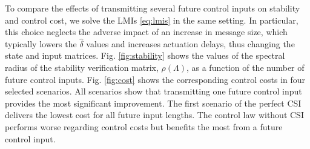 \documentclass[journal,twoside,web]{ieeecolor}
\begin{document}
To compare the effects of transmitting several future control inputs on stability and control cost, we solve the LMIs \eqref{eq:lmis} in the same setting. In particular, this choice neglects the adverse impact of an increase in message size, which typically lowers the $\hat{\delta}$ values and increases actuation delays, thus changing the state and input matrices. Fig. \ref{fig:stability} shows the values of the spectral radius of the stability verification matrix, $\rho(\mathit{\Lambda})$, as a function of the number of future control inputs. Fig. \ref{fig:cost} shows the corresponding control costs in four selected scenarios.
All scenarios show that transmitting one future control input provides the most significant improvement. The first scenario of the perfect CSI delivers the lowest cost for all future input lengths. The control law without CSI performs worse regarding control costs but benefits the most from a future control input.
\end{document}
